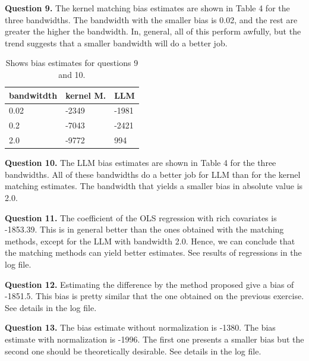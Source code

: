 \documentclass{article}
\theoremstyle{definition}
\begin{document}
\hspace{0.41cm} \textbf{Question 9.} The kernel matching bias estimates are shown in Table 4 for the three bandwidths. The bandwidth with the smaller bias is 0.02, and the rest are greater the higher the bandwidth. In, general, all of this perform awfully, but the trend suggests that a smaller bandwidth will do a better job.

\begin{table}[h]
\centering
\begin{tabular}{lll}
\hline
bandwitdth & kernel M. & LLM   \\
\hline
0.02       & -2349   & -1981 \\
0.2        & -7043     & -2421 \\
2.0        & -9772     & 994  \\
\hline
\end{tabular}
\caption{Shows bias estimates for questions 9 and 10. }
\end{table}

\hspace{0.41cm} \textbf{Question 10.} The LLM bias estimates are shown in Table 4 for the three bandwidths. All of these bandwidths do a better job for LLM than for the kernel matching estimates. The bandwidth that yields a smaller bias in absolute value is 2.0. 

\hspace{0.41cm} \textbf{Question 11.} The coefficient of the OLS regression with rich covariates is -1853.39. This is in general better than the ones obtained with the matching methods, except for the LLM with bandwidth 2.0. Hence, we can conclude that the matching methods can yield better estimates. See results of regressions in the log file.  

\hspace{0.41cm} \textbf{Question 12.} Estimating the difference by the method proposed give a bias of -1851.5. This bias is pretty similar that the one obtained on the previous exercise. See details in the log file.  

\hspace{0.41cm} \textbf{Question 13.} The bias estimate without normalization is -1380. The bias estimate with normalization  is -1996. The first one presents a smaller bias but the second one should be theoretically desirable. See details in the log file.  
\end{document}
